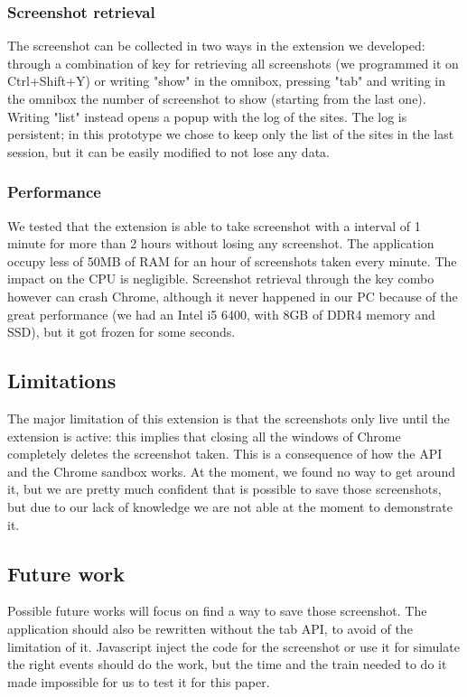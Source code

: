 \documentclass[12pt]{article}
\begin{document}
\begin{multicols}{2}
\subsubsection*{Screenshot retrieval}
The screenshot can be collected in two ways in the extension we developed:
through a combination of key for retrieving all screenshots (we programmed it on Ctrl+Shift+Y) or writing "show" in the omnibox, pressing "tab" and writing in the omnibox the number of screenshot to show (starting from the last one). Writing "list" instead opens a popup with the log of the sites.
 The log is persistent; in this prototype we chose to keep only the list of the sites in the last session, but it can be easily modified to not lose any data.
\subsubsection*{Performance}
We tested that the extension is able to take screenshot with a interval of 1 minute for more than 2 hours without losing any screenshot.
The application occupy less of 50MB of RAM for an hour of screenshots taken every minute. The impact on the CPU is negligible.
Screenshot retrieval through the key combo however can crash Chrome, although it never happened in our PC because of the great performance (we had an Intel i5 6400, with 8GB of DDR4 memory and SSD), but it got frozen for some seconds.
\subsection*{Limitations}
The major limitation of this extension is that the screenshots only live until the extension is active: this implies that closing all the windows of Chrome completely deletes the screenshot taken.
This is a consequence of how the API and the Chrome sandbox works. At the moment, we found no way to get around it, but we are pretty much confident that is possible to save those screenshots, but due to our lack of knowledge we are not able at the moment to demonstrate it.
\subsection*{Future work}
Possible future works will focus on find a way to save those screenshot.
The application should also be rewritten without the tab API, to avoid of the limitation of it.
Javascript inject the code for the screenshot or use it for simulate the right events should do the work, but the time and the train needed to do it made impossible for us to test it for this paper.

\end{multicols}
\end{document}
